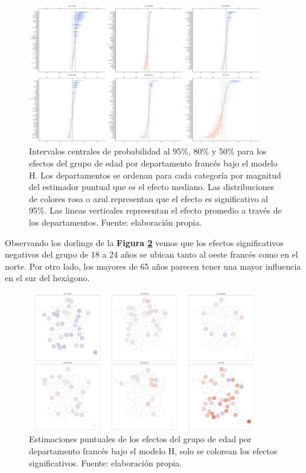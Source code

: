 \begin{figure}[h]
	\centering
	\includegraphics[width = 0.9\textwidth]{Figs/Efectos/Efectos_Edad_Modelo_H}
	\caption{Intervalos centrales de probabilidad al 95\%, 80\% y 50\% para los efectos del grupo de edad por departamento francés bajo el modelo H. Los departamentos se ordenan para cada categoría por magnitud del estimador puntual que es el efecto mediano. Las distribuciones de colores rosa o azul representan que el efecto es significativo al 95\%. Las lineas verticales representan el efecto promedio a través de los departamentos. Fuente: elaboración propia.}
	\label{fig:Efectos_Edad}
\end{figure}

Observando los dorlings de la \textbf{Figura \ref{fig:Dorling_Efectos_Edad}} vemos que los efectos significativos negativos del grupo de 18 a 24 años se ubican tanto al oeste francés como en el norte. Por otro lado, los mayores de 65 años parecen tener una mayor influencia en el sur del hexágono. 

\begin{figure}[H]
	\centering
	\includegraphics[width = 0.9\textwidth]{Figs/Efectos/Dorling_Efectos_Edad_Modelo_H}
	\caption{Estimaciones puntuales de los efectos del grupo de edad por departamento francés bajo el modelo H, solo se colorean los efectos significativos. Fuente: elaboración propia.}
	\label{fig:Dorling_Efectos_Edad}
\end{figure}


